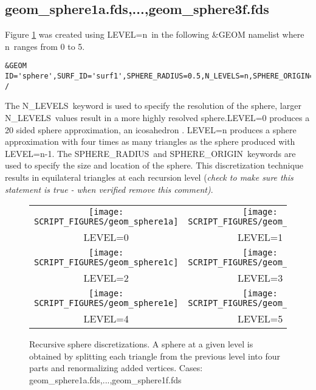 \documentclass[12pt]{article}
\begin{document}
\subsection{geom\_sphere1a.fds,...,geom\_sphere3f.fds}
Figure \ref{fig:geom_sphere} was created using {\ct LEVEL=n}\
in the following \&GEOM namelist
where {\ct n}\ ranges from 0 to 5.

{\scriptsize
\begin{verbatim}
&GEOM ID='sphere',SURF_ID='surf1',SPHERE_RADIUS=0.5,N_LEVELS=n,SPHERE_ORIGIN=0.0,0.0,0.0 /
\end{verbatim}
}

The {\ct N\_LEVELS}\ keyword is used
to specify the resolution of the sphere, larger {\ct N\_LEVELS}\ values result
in a more highly resolved sphere.{\ct LEVEL=0} produces a 20 sided sphere approximation, an icosahedron .
{\ct LEVEL=n} produces a sphere approximation with four times as many triangles as the
sphere produced with {\ct LEVEL=n-1}.
The {\ct SPHERE\_RADIUS}\ and {\ct SPHERE\_ORIGIN}\ keywords are used to specify
the size and location of the sphere.  This discretization technique results in equilateral triangles at each recursion level {(\em check to make sure this statement is true - when verified remove this comment)}.

\begin{figure}
\begin{center}
\begin{tabular}{cc}
 \texttt{[image: SCRIPT\_FIGURES/geom\_sphere1a]}&
 \texttt{[image: SCRIPT\_FIGURES/geom\_sphere1b]}\\
 LEVEL=0&LEVEL=1\\
 \texttt{[image: SCRIPT\_FIGURES/geom\_sphere1c]}&
 \texttt{[image: SCRIPT\_FIGURES/geom\_sphere1d]}\\
 LEVEL=2&LEVEL=3\\
 \texttt{[image: SCRIPT\_FIGURES/geom\_sphere1e]}&
 \texttt{[image: SCRIPT\_FIGURES/geom\_sphere1f]}\\
 LEVEL=4&LEVEL=5\\
  \end{tabular}
\end{center}
 \caption{Recursive sphere discretizations.  A sphere at a given level is
 obtained by splitting each triangle from the previous level into four parts and renormalizing added vertices. Cases: geom\_sphere1a.fds,...,geom\_sphere1f.fds}
\label{fig:geom_sphere}
\end{figure}
\end{document}
